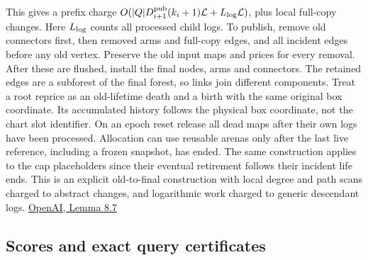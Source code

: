 \documentclass[11pt]{article}
\begin{document}
This gives a prefix charge \(O(|Q|D_{i+1}^{\rm pub}(k_i+1)\mathcal L+L_{\rm log}\mathcal L)\), plus local full-copy changes. Here \(L_{\rm log}\) counts all processed child logs. To publish, remove old connectors first, then removed arms and full-copy edges, and all incident edges before any old vertex. Preserve the old input maps and prices for every removal. After these are flushed, install the final nodes, arms and connectors. The retained edges are a subforest of the final forest, so links join different components. Treat a root reprice as an old-lifetime death and a birth with the same original box coordinate. Its accumulated history follows the physical box coordinate, not the chart slot identifier. On an epoch reset release all dead maps after their own logs have been processed. Allocation can use reusable arenas only after the last live reference, including a frozen snapshot, has ended. The same construction applies to the cap placeholders since their eventual retirement follows their incident life ends. This is an explicit old-to-final construction with local degree and path scans charged to abstract changes, and logarithmic work charged to generic descendant logs. \href{https://raw.githubusercontent.com/openai/math/adc7f1241b42e322a6451854ab7e4b4c146bf78a/preprints/Almost-Linear-Time-Maximum-Cardinality-Matching-in-Sparse-General-Graphs-September-24-2026/main.pdf\#page=71}{OpenAI, Lemma 8.7}

\hypertarget{scores-and-exact-query-certificates}{%
\subsection{Scores and exact query certificates}\label{scores-and-exact-query-certificates}}
\end{document}
